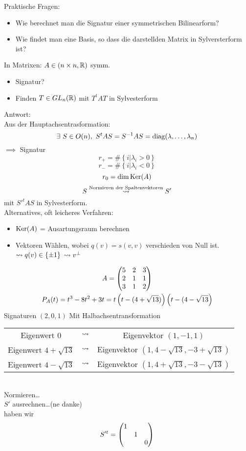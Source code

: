 \begin{Bem}
  Praktische Fragen:
  \begin{itemize}
    \item Wie berechnet man die Signatur einer symmetrischen Bilinearform?
    \item Wie findet man eine Basis, so dass die darstellden Matrix in Sylversterform ist?
  \end{itemize}
  In Matrixen: $A\in(n\times n, \mathbb{R})$ symm.
  \begin{itemize}
    \item Signatur?
    \item Finden $T\in GL_n(\mathbb{R})$ mit $T^tAT$ in Sylvesterform
  \end{itemize}
  Antwort:\\
  Aus der Hauptachsentrasformation:
  \[\exists\ S\in O(n),\ S^tAS=S^{-1}AS=\diag(\lambda,\dots,\lambda_n)\]
  $\implies$ Signatur
  \[r_+=\#\left\{ i|\lambda_i>0 \right\}\]
  \[r_-=\#\left\{ i|\lambda_i<0 \right\}\]
  \[r_0=\dim\operatorname{Ker}(A)\]
  \[S\stackrel{\text{Normieren der Spaltenvektoren}}{\rightsquigarrow}S'\]
  mit $S'^tAS$ in Sylvesterform.\\
  Alternatives, oft leicheres Verfahren:
  \begin{itemize}
    \item $\operatorname{Ker}(A)$ = Ausartungsraum berechnen
    \item Vektoren Wählen, wobei $q(v)=s(v,v)$ verschieden von Null ist. $\rightsquigarrow q(v)\in\left\{ \pm 1 \right\}$ $\rightsquigarrow v^\perp$
  \end{itemize}
\end{Bem}
\begin{Bsp}
  \begin{gather*}
    A=\begin{pmatrix}5&2&3\\ 2&1&1\\ 3&1&2\end{pmatrix}\\
    P_A(t)=t^3-8t^2+3t=t\left(t-(4+\sqrt{13})\right)\left( t-(4-\sqrt{13} \right)\\
  \end{gather*}
  Signaturen $(2,0,1)$
  Mit Halbachsentransformation\\
  \begin{tabular}{ccc}
    Eigenwert 0&$\rightsquigarrow$&Eigenvektor $(1,-1,1)$\\
    Eigenwert $4+\sqrt{13}$ & $\rightsquigarrow$ & Eigenvektor $(1,4-\sqrt{13},-3+\sqrt{13})$\\
    Eigenwert $4-\sqrt{13}$ & $\rightsquigarrow$ & Eigenvektor $(1,4+\sqrt{13},-3-\sqrt{13})$
  \end{tabular}\\
  Normieren\dots\\
  $S'$ ausrechnen\dots (ne danke)\\
  haben wir 
  \[S'^t=\begin{pmatrix}1&&\\&1&\\&&0\end{pmatrix}\]
\end{Bsp}
